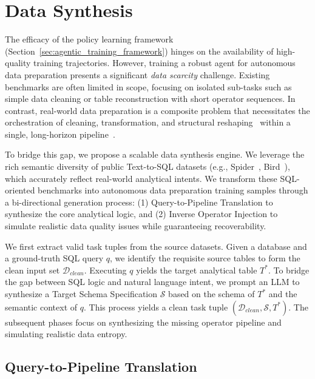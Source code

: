\section{Data Synthesis}
\label{sec:data_synthesis}

The efficacy of the policy learning framework (Section~\ref{sec:agentic_training_framework}) hinges on the availability of high-quality training trajectories. However, training a robust agent for autonomous data preparation presents a significant \textit{data scarcity} challenge.
Existing benchmarks are often limited in scope, focusing on isolated sub-tasks such as simple data cleaning or table reconstruction with short operator sequences. In contrast, real-world data preparation is a composite problem that necessitates the orchestration of cleaning, transformation, and structural reshaping~\cite{heer2015predictive} within a single, long-horizon pipeline~\cite{2011-wrangler}.

To bridge this gap, we propose a scalable data synthesis engine. We leverage the rich semantic diversity of public Text-to-SQL datasets (e.g., Spider~\cite{spider_dataset}, Bird~\cite{bird_dataset}), which accurately reflect real-world analytical intents.
We transform these SQL-oriented benchmarks into autonomous data preparation training samples through a bi-directional generation process: (1) {Query-to-Pipeline Translation} to synthesize the core analytical logic, and (2) {Inverse Operator Injection} to simulate realistic data quality issues while guaranteeing recoverability.

We first extract valid task tuples from the source datasets. Given a database and a ground-truth SQL query $q$, we identify the requisite source tables to form the clean input set $\mathcal{D}_{clean}$. Executing $q$ yields the target analytical table $T^*$.
To bridge the gap between SQL logic and natural language intent, we prompt an LLM to synthesize a {Target Schema Specification $\mathcal{S}$} based on the schema of $T^*$ and the semantic context of $q$.
This process yields a clean task tuple $(\mathcal{D}_{clean}, \mathcal{S}, T^*)$. The subsequent phases focus on synthesizing the missing operator pipeline and simulating realistic data entropy.

\subsection{Query-to-Pipeline Translation}
\label{subsec:forward_synthesis}

